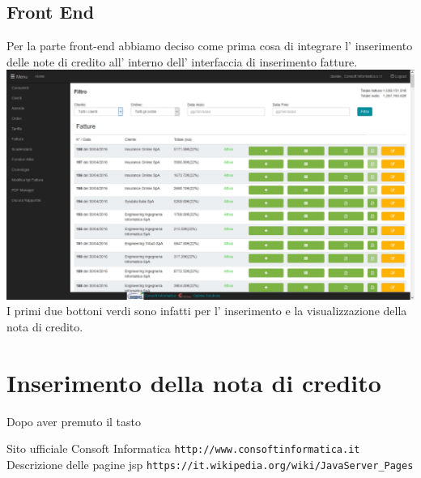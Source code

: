 \documentclass[12pt]{book}
\begin{document}
\subsection{Front End}
Per la parte front-end abbiamo deciso come prima cosa di integrare 
l' inserimento delle note di credito all' interno dell' interfaccia 
di inserimento fatture.
\newline
\newline
\includegraphics[scale=0.4]{img/lista_fatture}
\newline
I primi due bottoni verdi sono infatti per l' inserimento e la visualizzazione
della nota di credito.
\section{Inserimento della nota di credito}
Dopo aver premuto il tasto 
\begin{thebibliography}{9}
     Sito ufficiale Consoft Informatica \newline
    \texttt{http://www.consoftinformatica.it}
     Descrizione delle pagine jsp \newline
    \texttt{https://it.wikipedia.org/wiki/JavaServer\_Pages}
\end{thebibliography}
\end{document}

